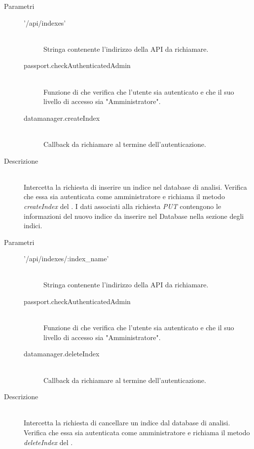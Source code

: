 \begin{description}
\begin{description}
\begin{mldescription}
     \hfill 
    \begin{description}
    \item[Parametri] \hfill
     \begin{description}
      \item['/api/indexes'] \hfill \\
      Stringa contenente l'indirizzo della API da richiamare.
      \item[passport.checkAuthenticatedAdmin] \hfill \\
      Funzione di  che verifica che l'utente sia autenticato e che il suo livello di accesso sia "Amministratore".
      \item[datamanager.createIndex] \hfill \\
      Callback da richiamare al termine dell'autenticazione.
     \end{description}
    \item[Descrizione] \hfill \\
    Intercetta la richiesta di inserire un indice nel database di analisi. Verifica che essa sia autenticata come amministratore e richiama il metodo \textit{createIndex} del . I dati associati alla richiesta \textit{PUT} contengono le informazioni del nuovo indice da inserire nel Database nella sezione degli indici. 
    \end{description}
    
     \hfill 
 \begin{description}
    \item[Parametri] \hfill
     \begin{description}
      \item['/api/indexes/:index\_name'] \hfill \\
      Stringa contenente l'indirizzo della API da richiamare.
      \item[passport.checkAuthenticatedAdmin] \hfill \\
      Funzione di  che verifica che l'utente sia autenticato e che il suo livello di accesso sia "Amministratore".
      \item[datamanager.deleteIndex] \hfill \\
      Callback da richiamare al termine dell'autenticazione.
     \end{description}
    \item[Descrizione] \hfill \\
    Intercetta la richiesta di cancellare un indice dal database di analisi. Verifica che essa sia autenticata come amministratore e richiama il metodo \textit{deleteIndex} del .
   \end{description}
 

\end{mldescription}
\end{description}
\end{description}
